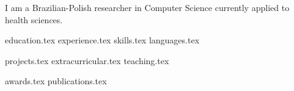 \documentclass[letterpaper,11pt]{article}
\begin{document}
\vspace{0.35cm}
{\justifying
I am a Brazilian-Polish researcher in Computer Science currently applied to health sciences.

}

{education.tex}
{experience.tex}
\sidebyside
    {{skills.tex}}
    {{languages.tex}}


{projects.tex}
{extracurricular.tex}
{teaching.tex}

{awards.tex}
{publications.tex}
\end{document}
